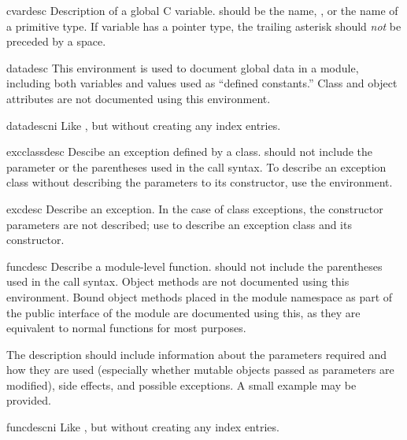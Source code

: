 \documentclass{howto}
\begin{document}
    \begin{envdesc}{cvardesc}{}
      Description of a global C variable.   should be the
       name, , or the name of
      a primitive type.  If variable has a pointer type, the trailing
      asterisk should \emph{not} be preceded by a space.
    \end{envdesc}

    \begin{envdesc}{datadesc}{}
      This environment is used to document global data in a module,
      including both variables and values used as ``defined
      constants.''  Class and object attributes are not documented
      using this environment.
    \end{envdesc}
    \begin{envdesc}{datadescni}{}
      Like , but without creating any index entries.
    \end{envdesc}

    \begin{envdesc}{excclassdesc}{}
      Descibe an exception defined by a class.   should not include the  parameter or
      the parentheses used in the call syntax.  To describe an
      exception class without describing the parameters to its
      constructor, use the  environment.
    \end{envdesc}

    \begin{envdesc}{excdesc}{}
      Describe an exception.  In the case of class exceptions, the
      constructor parameters are not described; use 
      to describe an exception class and its constructor.
    \end{envdesc}

    \begin{envdesc}{funcdesc}{}
      Describe a module-level function.   should
      not include the parentheses used in the call syntax.  Object
      methods are not documented using this environment.  Bound object
      methods placed in the module namespace as part of the public
      interface of the module are documented using this, as they are
      equivalent to normal functions for most purposes.

      The description should include information about the parameters
      required and how they are used (especially whether mutable
      objects passed as parameters are modified), side effects, and
      possible exceptions.  A small example may be provided.
    \end{envdesc}
    \begin{envdesc}{funcdescni}{}
      Like , but without creating any index entries.
    \end{envdesc}
\end{document}
